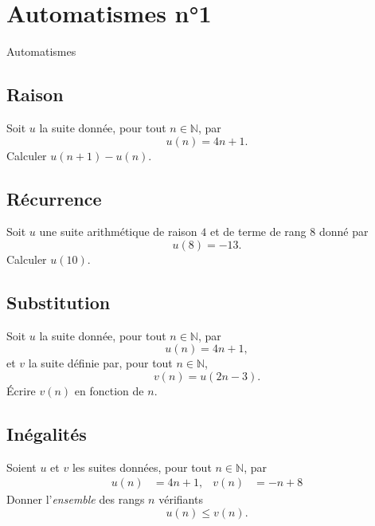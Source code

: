 \documentclass[14pt]{beamer}
\newcommand{\N}{\mathbb{N}}
\begin{document}
\section{Automatismes n°1}

\begin{frame}

\centering \huge
Automatismes

\end{frame}


\subsection{Raison}

\begin{frame}{1}

	Soit $u$ la suite donnée, pour tout $n\in\N$, par
		\[ u(n) = 4n+1. \]
	Calculer $u(n+1) - u(n)$.

\end{frame}

\subsection{Récurrence}

\begin{frame}{2}
	Soit $u$ une suite arithmétique de raison $4$ et de terme de rang $8$ donné par
		\[ u(8) = -13. \]
	Calculer $u(10)$.

\end{frame}

\subsection{Substitution}

\begin{frame}{3}

	Soit $u$ la suite donnée, pour tout $n\in\N$, par
		\[ u(n) = 4n+1, \]
	et $v$ la suite définie par, pour tout $n\in\N$, 
		\[ v(n) = u(2n-3). \]
	Écrire $v(n)$ en fonction de $n$.	
\end{frame}

%
%

\subsection{Inégalités}

\begin{frame}{4}

	Soient $u$ et $v$ les suites données, pour tout $n\in\N$, par
		\begin{align*}
			u(n) &= 4n+1, & v(n) &= -n+8
		\end{align*}
	Donner l'\emph{ensemble} des rangs $n$ vérifiants
		\[ u(n) \leq v(n). \]
\end{frame}
\end{document}
